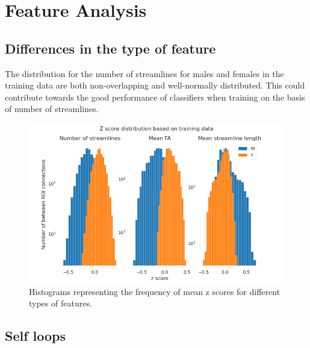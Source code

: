 \documentclass[msthesis.tex]{subfiles}
\begin{document}
\section{Feature Analysis}
\subsection{Differences in the type of feature}

The distribution for the number of streamlines for males and females in the training data are both non-overlapping and well-normally distributed. This could contribute towards the good performance of classifiers when training on the basis of number of streamlines. 
\begin{figure}
    \centering
    \includegraphics[width=\textwidth]{images/zscoredist.png}
    \caption{Histograms representing the frequency of mean z scores for different types of features.}
    \label{fig:my_label}
\end{figure}
\subsection{Self loops}
\label{res:selfloops}
\end{document}
